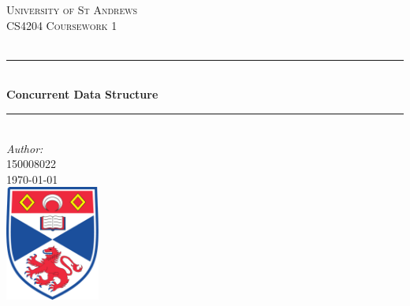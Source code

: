 \documentclass[12pt]{article}
\begin{document}
\begin{titlepage}

\newcommand{\HRule}{\rule{\linewidth}{0.5mm}} %

\center %
 

\textsc{\LARGE University of St Andrews}\\[1.5cm] %
\textsc{\Large CS4204 Coursework 1}\\[0.5cm] %
\textsc{\large }\\[0.5cm] %


\HRule \\[0.4cm]
{ \huge \bfseries Concurrent Data Structure}\\[0.4cm] %
\HRule \\[1.5cm]
 


\Large \emph{Author:}\\
 \textsc{150008022}\\[3cm] %


{\large \today}\\[2cm] %


\includegraphics[width = 3.1cm]{images/standrewslogo.png}
 

\vfill %

\end{titlepage}
\end{document}
